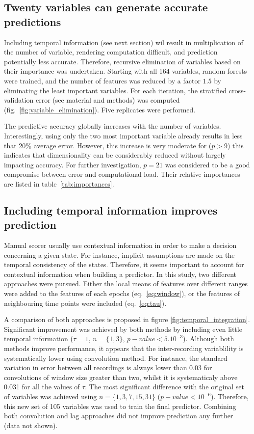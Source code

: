 \subsection{Twenty variables can generate accurate predictions}
Including temporal information (see next section) wil result in multiplication of the number of variable, rendering computation difficult, and prediction potentially less accurate.
Therefore, recursive elimination of variables based on their importance was undertaken.
Starting with all 164 variables, random forests were trained, and the number of features was reduced by a factor $1.5$  by eliminating the least important variables.
For each iteration, the stratified cross-validation error (see material and methods) was computed (fig.~\ref{fig:variable_elimination}). Five replicates were performed.


The predictive accuracy globally increases with the number of variables.
Interestingly, using only the two most important variable already results in less that 20\% average error.
However, this increase is very moderate for ($p>9$) this indicates that dimensionality can be considerably reduced without largely impacting accuracy.
For further investigation, $p=21$ was considered to be a good compromise between error and computational load. Their relative importances are listed in table~\ref{tab:importances}.


\subsection{Including temporal information improves prediction}
Manual scorer usually use contextual information in order to make a decision concerning a given state.
For instance, implicit assumptions are made on the temporal consistency of the states.
Therefore, it seems important to account for contextual information when building a predictor.
In this study, two different approaches were pursued.
Either the local means of features over different ranges were added to the features
of each epochs (eq.~\ref{eq:window}),
or the features of neighbouring time points were included (eq.~\ref{eq:tau}).

A comparison of both approaches is proposed in figure \ref{fig:temporal_integration}.
Significant improvement was achieved by both methods by including even little temporal information ($\tau = 1$, $n=\{1,3\}$, $p-value < 5.10^{-3}$).
Although both methods improve performance, it appears that the inter-recording variablility is systematically lower using convolution method.
For instance, the standard variation in error between all recordings is always lower than 0.03 for convolutions of window size greater than two,
whilst it is systematicaly above 0.031 for all the values of $\tau$.
The most significant difference with the original set of variables was achieved using $n = \{1,3,7,15,31\}$ ($p-value < 10^{-6}$).
Therefore, this new set of 105 variables was used to train the final predictor.
Combining both convolution and lag approaches did not improve prediction any further (data not shown).

